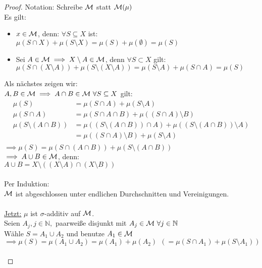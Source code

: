   \begin{proof}
    Notation: Schreibe $\mathcal{M}$ statt $\mathcal{M}(\mu)$\\
    Es gilt:
    \begin{itemize}
      \item $x \in \mathcal{M}$, denn: $\forall S \subseteq X$ ist:\\
            $\mu(S \cap X) + \mu(S \setminus X) = \mu(S) + \mu(\emptyset) = \mu(S)$
      \item Sei $A \in \mathcal{M} \implies X \setminus A \in \mathcal{M}$, denn $\forall S \subset X$ gilt:\\
            $\mu(S \cap (X \setminus A)) + \mu(S \setminus (X \setminus A)) = \mu(S \setminus A) + \mu(S \cap A) = \mu(S)$
    \end{itemize}
    Als nächstes zeigen wir:\\
    $A,B \in \mathcal{M} \implies A \cap B \in \mathcal{M} \ \forall S \subseteq X$ gilt:
    \begin{align*}
      \mu(S) 
      &= \mu(S \cap A) + \mu(S \setminus A)\\
      \mu(S \cap A) 
      &= \mu(S \cap A \cap B) + \mu((S \cap A) \setminus B)\\
      \mu(S \setminus (A \cap B)) 
      &= \mu((S \setminus (A \cap B)) \cap A) + \mu((S \setminus (A \cap B)) \setminus A)\\
      &= \mu((S \cap A) \setminus B) + \mu(S \setminus A)\\
    \end{align*}
    $\implies \mu(S) = \mu(S \cap (A \cap B)) + \mu(S \setminus (A \cap B))$\\
    $\implies A \cup B \in \mathcal{M}$, denn:\\
    $A \cup B = X \setminus ((X \setminus A) \cap (X \setminus B))$\\ \\
    Per Induktion:\\
    $\mathcal{M}$ ist abgeschlossen unter endlichen Durchschnitten und Vereinigungen.\\ \\
    \underline{Jetzt:} $\mu$ ist $\sigma$-additiv auf $\mathcal{M}$.\\
    Seien $A_j, j \in \mathbb{N},$ paarweiße disjunkt mit $A_j \in \script{M} \ \forall j \in \mathbb{N}$\\
    Wähle $S = A_1 \cup A_2$ und benutze $A_1 \in \mathcal{M}$\\
    $\implies \mu(S) = \mu(A_1 \cup A_2) = \mu(A_1) + \mu(A_2) \ \ (= \mu(S \cap A_1) + \mu(S \setminus A_1))$\\ \\

\end{proof}
